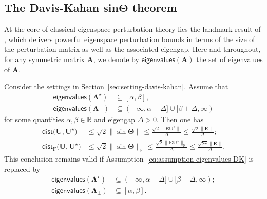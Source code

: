 \subsection{The Davis-Kahan sin$\bm{\Theta}$ theorem}

At the core of classical eigenspace perturbation theory lies the landmark result of \citet{davis1970rotation},
which delivers powerful eigenspace perturbation bounds in terms of the size of the perturbation matrix as well as the associated eigengap.
Here and throughout, for any symmetric matrix $\bm{A}$, we denote by $\mathsf{eigenvalues}(\bm{A})$ the set of eigenvalues of $\bm{A}$.



\begin{theorem}
\label{thm:davis-kahan}
Consider the settings in Section~\ref{sec:setting-davis-kahan}. Assume that
%
\begin{subequations}
\label{eq:assumption-eigenvalues-DK}
\begin{align}
	\mathsf{eigenvalues}(\bm{\Lambda}^{\star}) &\subseteq [\alpha,\beta] ,\\
	\mathsf{eigenvalues}(\bm{\Lambda}_{\perp}) &\subseteq (-\infty, \alpha-\Delta] \cup [\beta+\Delta, \infty)
\end{align}
\end{subequations}
%
for some quantities $\alpha,\beta\in \mathbb{R}$ and eigengap $\Delta>0$. Then one has
\begin{subequations}
\label{eq:davis-kahan-conclusion-general}
\begin{align}
\mathsf{dist}\big(\bm{U},\bm{U}^{\star}\big) & \leq\sqrt{2}\|\sin\bm{\Theta}\|\leq\frac{\sqrt{2}\big\|\bm{E}\bm{U}^{\star}\big\|}{\Delta}\leq\frac{\sqrt{2}\|\bm{E}\|}{\Delta};\\
\mathsf{dist}_{\mathrm{F}}\big(\bm{U},\bm{U}^{\star}\big) & \leq\sqrt{2}\|\sin\bm{\Theta}\|_{\mathrm{F}}\leq\frac{\sqrt{2}\big\|\bm{E}\bm{U}^{\star}\big\|_{\mathrm{F}}}{\Delta}\leq\frac{\sqrt{2r}\|\bm{E}\|}{\Delta}.
\end{align}
\end{subequations}
%
This conclusion remains valid if Assumption~\eqref{eq:assumption-eigenvalues-DK} is replaced by
%
\begin{subequations}
\label{eq:assumption-eigenvalues-DK-reverse}
\begin{align}
	\mathsf{eigenvalues}(\bm{\Lambda}^{\star}) &\subseteq (-\infty, \alpha-\Delta] \cup [\beta+\Delta, \infty) ; \\
	\mathsf{eigenvalues}(\bm{\Lambda}_{\perp}) &\subseteq [\alpha,\beta].
\end{align}
\end{subequations}
%
\end{theorem}
%






